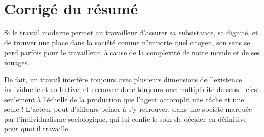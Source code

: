 \documentclass[a4paper,12pt]{book}
\begin{document}
\section{Corrigé du résumé}
Si le travail moderne permet au travailleur d'assurer sa subsistance, sa dignité, et de trouver une place dans la société comme n'importe quel citoyen, son sens se perd parfois pour le travailleur, à cause de la complexité de notre monde et de ses rouages.
\par De fait, un travail interfère toujours avec plusieurs dimensions de l'existence individuelle et collective, et recouvre donc toujours une multiplicité de sens - c'est seulement à l'échelle de la production que l'agent accomplit une tâche et une seule ! L'acteur peut d'ailleurs peiner à s'y retrouver, dans une société marquée par l'individualisme sociologique, qui lui confie le soin de décider en définitive pour quoi il travaille.
\end{document}
